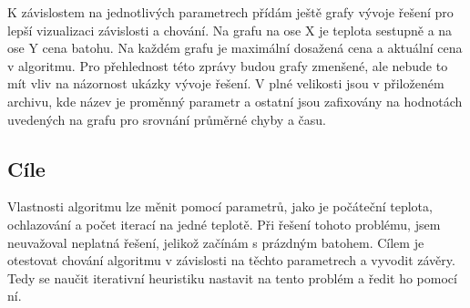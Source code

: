 \documentclass[11pt]{article}
\begin{document}
K závislostem na jednotlivých parametrech přídám ještě grafy vývoje řešení pro lepší vizualizaci závislosti a chování. Na grafu na ose X je teplota sestupně a na ose Y cena batohu. Na každém grafu je maximální dosažená cena a aktuální cena v algoritmu. Pro přehlednost této zprávy budou grafy zmenšené, ale nebude to mít vliv na názornost ukázky vývoje řešení. V plné velikosti jsou v přiloženém archivu, kde název je proměnný parametr a ostatní jsou zafixovány na hodnotách uvedených na grafu pro srovnání průměrné chyby a času.
 
\subsection{Cíle}

Vlastnosti algoritmu lze měnit pomocí parametrů, jako je počáteční teplota, ochlazování a počet iterací na jedné teplotě. Při řešení tohoto problému, jsem neuvažoval neplatná řešení, jelikož začínám s prázdným batohem. Cílem je otestovat chování algoritmu v závislosti na těchto parametrech a vyvodit závěry. Tedy se naučit iterativní heuristiku nastavit na tento problém a ředit ho pomocí ní. 
\end{document}
